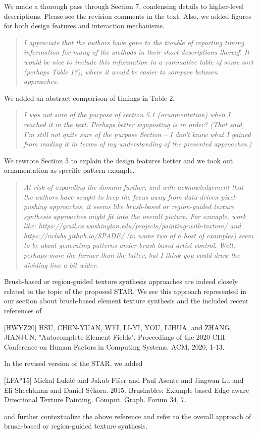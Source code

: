 \documentclass{egpubl}
\newcommand{\rev}[2]{{\color{greenrev}\textsuperscript{#1}#2}}
\renewcommand{\rev}[2]{{#2}}
\begin{document}
\rev{}{We made a thorough pass through Section 7, condensing details to higher-level descriptions. Please see the revision comments in the text. Also, we added figures for both design features and interaction mechanisms.}

\begin{quote}
\emph{I appreciate that the authors have gone to the trouble of reporting timing information for many of the methods in their short descriptions thereof. It would be nice to include this information in a summative table of some sort (perhaps Table 1?), where it would be easier to compare between approaches.}
\end{quote}


\rev{}{We added an abstract comparison of timings in Table 2.}

\begin{quote}
\emph{I was not sure of the purpose of section 5.1 (ornamentation) when I reached it in the text. Perhaps better signposting is in order? (That said, I'm still not quite sure of the purpose Section -- I don't know what I gained from reading it in terms of my understanding of the presented approaches.)}
\end{quote}

\rev{}{We rewrote Section 5 to explain the design features better and we took out ornamentation as specific pattern example.}

\begin{quote}
\emph{At risk of expanding the domain further, and with acknowledgement that the authors have sought to keep the focus away from data-driven pixel-pushing approaches,  it seems like brush-based or region-guided texture synthesis approaches might fit into the overall picture. For example, work like:
https://grail.cs.washington.edu/projects/painting-with-texture/
and https://nvlabs.github.io/SPADE/
(to name two of a host of examples)
seem to be about generating patterns under brush-based artist control. Well, perhaps more the former than the latter, but I think you could draw the dividing line a bit wider.}
\end{quote}

\rev{}{
    Brush-based or region-guided texture synthesis approaches are indeed closely related to the topic of the proposed STAR. We see this approach represented in our section about brush-based element texture synthesis and the included recent references of 

    [HWYZ20]  HSU, CHEN-YUAN, WEI, LI-YI, YOU, LIHUA, and ZHANG, JIANJUN. "Autocomplete Element Fields". Proceedings of the 2020 CHI Conference on Human Factors in Computing Systems. ACM, 2020, 1-13.

    In the revised version of the STAR, we added
    
    [LFA*15] Michal Luk\'{a}\v{c} and Jakub Fi\v{s}er and Paul Asente and Jingwan Lu and Eli Shechtman and Daniel S\'{y}kora. 2015. Brushables: Example-based Edge-aware Directional Texture Painting. Comput. Graph. Forum 34, 7.
    
    and further contextualize the above reference and refer to the overall approach of brush-based or region-guided texture synthesis.
}
\end{document}
